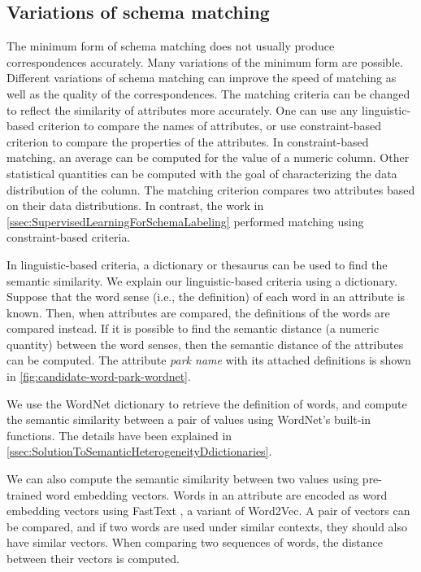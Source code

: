 \subsection{Variations of schema matching}
\label{ssec:VariationsOfSchemaMatching}

The minimum form of schema matching does not usually produce correspondences accurately. Many variations of the minimum form are possible. Different variations of schema matching can improve the speed of matching as well as the quality of the correspondences. The matching criteria can be changed to reflect the similarity of attributes more accurately. One can use any linguistic-based criterion to compare the names of attributes, or use constraint-based criterion to compare the properties of the attributes. In constraint-based matching, an average can be computed for the value of a numeric column. Other statistical quantities can be computed with the goal of characterizing the data distribution of the column. The matching criterion compares two attributes based on their data distributions. In contrast, the work in \autoref{ssec:SupervisedLearningForSchemaLabeling} performed matching using constraint-based criteria.

In linguistic-based criteria, a dictionary or thesaurus can be used to find the semantic similarity. We explain our linguistic-based criteria using a dictionary. Suppose that the word sense (i.e., the definition) of each word in an attribute is known. Then, when attributes are compared, the definitions of the words are compared instead. If it is possible to find the semantic distance (a numeric quantity) between the word senses, then the semantic distance of the attributes can be computed. The attribute \textit{park name} with its attached definitions is shown in \autoref{fig:candidate-word-park-wordnet}.

We use the WordNet dictionary to retrieve the definition of words, and compute the semantic similarity between a pair of values using WordNet's built-in functions. The details have been explained in \autoref{ssec:SolutionToSemanticHeterogeneityDdictionaries}.

We can also compute the semantic similarity between two values using pre-trained word embedding vectors. Words in an attribute are encoded as word embedding vectors using FastText \cite{Mudgal2018Deep,Nargesian2018Table}, a variant of Word2Vec. A pair of vectors can be compared, and if two words are used under similar contexts, they should also have similar vectors. When comparing two sequences of words, the distance between their vectors is computed.


